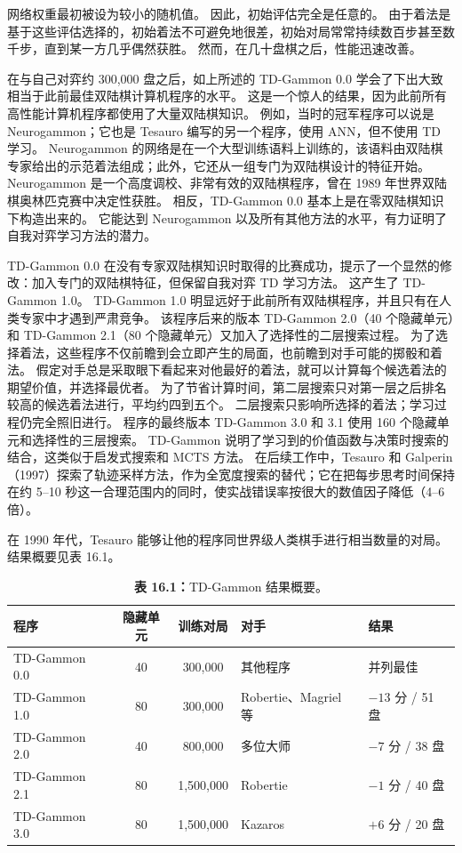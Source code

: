 \documentclass[UTF8,12pt,a4paper,fontset=fandol]{ctexart}
\begin{document}
网络权重最初被设为较小的随机值。
因此，初始评估完全是任意的。
由于着法是基于这些评估选择的，初始着法不可避免地很差，初始对局常常持续数百步甚至数千步，直到某一方几乎偶然获胜。
然而，在几十盘棋之后，性能迅速改善。

在与自己对弈约 300,000 盘之后，如上所述的 TD-Gammon 0.0 学会了下出大致相当于此前最佳双陆棋计算机程序的水平。
这是一个惊人的结果，因为此前所有高性能计算机程序都使用了大量双陆棋知识。
例如，当时的冠军程序可以说是 Neurogammon；它也是 Tesauro 编写的另一个程序，使用 ANN，但不使用 TD 学习。
Neurogammon 的网络是在一个大型训练语料上训练的，该语料由双陆棋专家给出的示范着法组成；此外，它还从一组专门为双陆棋设计的特征开始。
Neurogammon 是一个高度调校、非常有效的双陆棋程序，曾在 1989 年世界双陆棋奥林匹克赛中决定性获胜。
相反，TD-Gammon 0.0 基本上是在零双陆棋知识下构造出来的。
它能达到 Neurogammon 以及所有其他方法的水平，有力证明了自我对弈学习方法的潜力。

TD-Gammon 0.0 在没有专家双陆棋知识时取得的比赛成功，提示了一个显然的修改：加入专门的双陆棋特征，但保留自我对弈 TD 学习方法。
这产生了 TD-Gammon 1.0。
TD-Gammon 1.0 明显远好于此前所有双陆棋程序，并且只有在人类专家中才遇到严肃竞争。
该程序后来的版本 TD-Gammon 2.0（40 个隐藏单元）和 TD-Gammon 2.1（80 个隐藏单元）又加入了选择性的二层搜索过程。
为了选择着法，这些程序不仅前瞻到会立即产生的局面，也前瞻到对手可能的掷骰和着法。
假定对手总是采取眼下看起来对他最好的着法，就可以计算每个候选着法的期望价值，并选择最优者。
为了节省计算时间，第二层搜索只对第一层之后排名较高的候选着法进行，平均约四到五个。
二层搜索只影响所选择的着法；学习过程仍完全照旧进行。
程序的最终版本 TD-Gammon 3.0 和 3.1 使用 160 个隐藏单元和选择性的三层搜索。
TD-Gammon 说明了学习到的价值函数与决策时搜索的结合，这类似于启发式搜索和 MCTS 方法。
在后续工作中，Tesauro 和 Galperin（1997）探索了轨迹采样方法，作为全宽度搜索的替代；它在把每步思考时间保持在约 5--10 秒这一合理范围内的同时，使实战错误率按很大的数值因子降低（4--6 倍）。

在 1990 年代，Tesauro 能够让他的程序同世界级人类棋手进行相当数量的对局。
结果概要见表 16.1。

\begin{table}[htbp]
\centering
\caption*{\textbf{表 16.1：}TD-Gammon 结果概要。}
\begin{tabular}{l c c l l}
\toprule
程序 & 隐藏单元 & 训练对局 & 对手 & 结果 \\
\midrule
TD-Gammon 0.0 & 40 & 300,000 & 其他程序 & 并列最佳 \\
TD-Gammon 1.0 & 80 & 300,000 & Robertie、Magriel 等 & $-13$ 分 / 51 盘 \\
TD-Gammon 2.0 & 40 & 800,000 & 多位大师 & $-7$ 分 / 38 盘 \\
TD-Gammon 2.1 & 80 & 1,500,000 & Robertie & $-1$ 分 / 40 盘 \\
TD-Gammon 3.0 & 80 & 1,500,000 & Kazaros & $+6$ 分 / 20 盘 \\
\bottomrule
\end{tabular}
\end{table}
\end{document}

